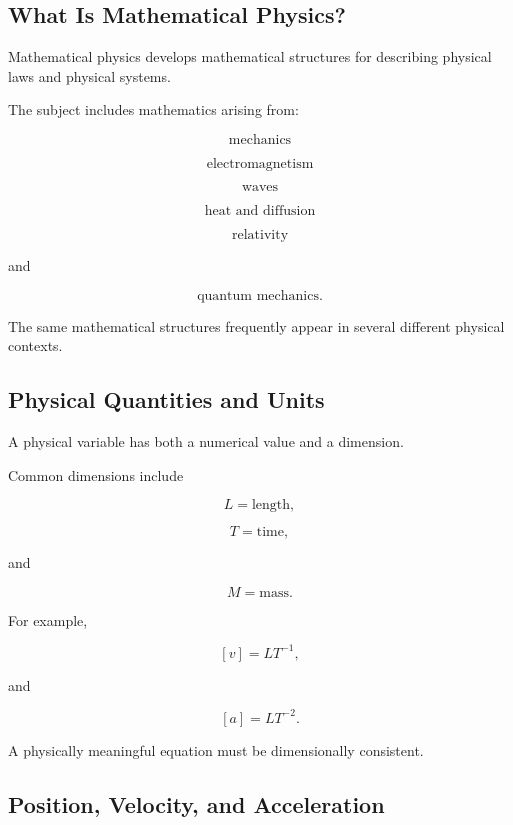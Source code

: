 \subsection{What Is Mathematical Physics?}
\label{subsec:what-is-mathematical-physics}

Mathematical physics develops mathematical structures for describing
physical laws and physical systems.

The subject includes mathematics arising from:

\[
\boxed{
\text{mechanics}
}
\]

\[
\boxed{
\text{electromagnetism}
}
\]

\[
\boxed{
\text{waves}
}
\]

\[
\boxed{
\text{heat and diffusion}
}
\]

\[
\boxed{
\text{relativity}
}
\]

and

\[
\boxed{
\text{quantum mechanics}.
}
\]

The same mathematical structures frequently appear in several different
physical contexts.

\subsection{Physical Quantities and Units}
\label{subsec:physical-quantities-units}

A physical variable has both a numerical value and a dimension.

Common dimensions include

\[
\boxed{
L
=
\text{length},
}
\]

\[
\boxed{
T
=
\text{time},
}
\]

and

\[
\boxed{
M
=
\text{mass}.
}
\]

For example,

\[
[v]
=
LT^{-1},
\]

and

\[
[a]
=
LT^{-2}.
\]

A physically meaningful equation must be dimensionally consistent.

\subsection{Position, Velocity, and Acceleration}
\label{subsec:position-velocity-acceleration}

